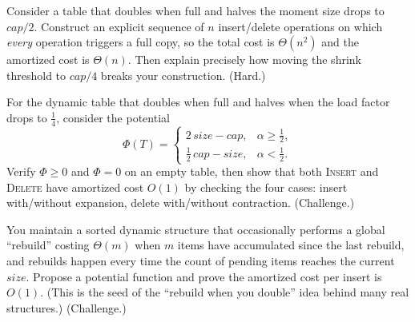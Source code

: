 \begin{exercise}
Consider a table that doubles when full and halves the moment size drops to
$\mathit{cap}/2$. Construct an explicit sequence of $n$ insert/delete operations on
which \emph{every} operation triggers a full copy, so the total cost is
$\Theta(n^2)$ and the amortized cost is $\Theta(n)$. Then explain precisely how
moving the shrink threshold to $\mathit{cap}/4$ breaks your construction. (Hard.)
\end{exercise}

\begin{exercise}
For the dynamic table that doubles when full and halves when the load factor drops
to $\tfrac14$, consider the potential
\[
  \Phi(T) = \begin{cases}
    2\,\mathit{size} - \mathit{cap}, & \alpha \ge \tfrac12,\\[2pt]
    \tfrac12\,\mathit{cap} - \mathit{size}, & \alpha < \tfrac12.
  \end{cases}
\]
Verify $\Phi \ge 0$ and $\Phi = 0$ on an empty table, then show that both
\textsc{Insert} and \textsc{Delete} have amortized cost $O(1)$ by checking the four
cases: insert with/without expansion, delete with/without contraction. (Challenge.)
\end{exercise}

\begin{exercise}
You maintain a sorted dynamic structure that occasionally performs a global
``rebuild'' costing $\Theta(m)$ when $m$ items have accumulated since the last
rebuild, and rebuilds happen every time the count of pending items reaches the
current $\mathit{size}$. Propose a potential function and prove the amortized cost
per insert is $O(1)$. (This is the seed of the ``rebuild when you double'' idea
behind many real structures.) (Challenge.)
\end{exercise}
